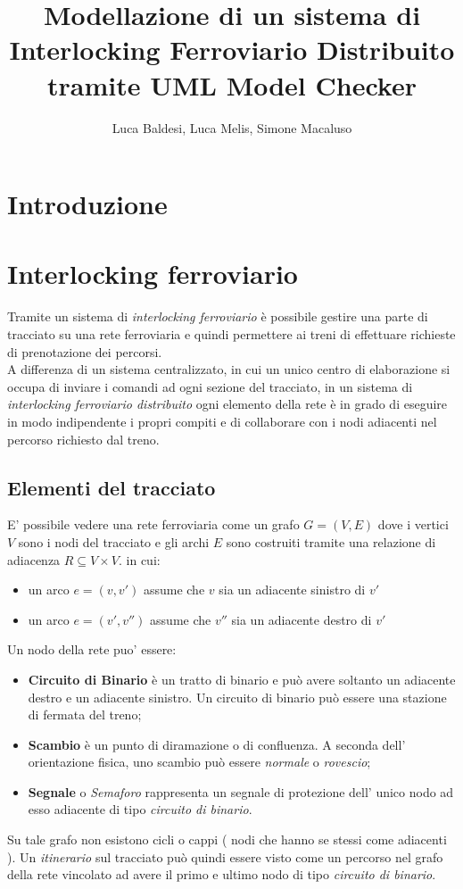 \documentclass[10pt,a4paper,oneside]{report}
\author{Luca Baldesi, Luca Melis, Simone Macaluso}
\title{Modellazione di un sistema di
Interlocking Ferroviario Distribuito
tramite UML Model Checker
}
\begin{document}
\maketitle

\chapter*{Introduzione}
\chapter{Interlocking ferroviario}
Tramite un sistema di \textit{interlocking ferroviario} è possibile gestire una parte di tracciato su una rete ferroviaria e quindi permettere ai treni di effettuare richieste di prenotazione dei percorsi.\\
A differenza di un sistema centralizzato, in cui un unico centro di elaborazione si occupa di inviare i comandi ad ogni sezione del tracciato, in un sistema di \textit{interlocking ferroviario distribuito} ogni elemento della rete è in grado di eseguire in modo indipendente i propri compiti e di collaborare con i nodi adiacenti nel percorso richiesto dal treno.
\section{Elementi del tracciato} 
E' possibile vedere una rete ferroviaria come un grafo $G =(V,E) $ dove i vertici $V$ sono i nodi del tracciato e gli archi $E$ sono costruiti tramite una relazione di adiacenza $R \subseteq V \times V$. in cui:
\begin{itemize}
\item un arco $e=(v,v')$ assume che $v$ sia un adiacente sinistro di $v'$ 
\item un arco $e=(v',v'')$ assume che $v''$ sia un adiacente destro di $v'$ 
\end{itemize}
Un nodo della rete puo' essere:
\begin{itemize}
\item \textbf{Circuito di Binario} è un tratto di binario e può avere soltanto un adiacente destro e un adiacente sinistro. Un circuito di binario può essere una stazione di fermata del treno;
\item \textbf{Scambio} è un punto di diramazione o di confluenza. A seconda dell' orientazione fisica, uno scambio può essere \textit{normale} o \textit{rovescio}; 
\item \textbf{Segnale} o \emph{Semaforo} rappresenta un segnale di protezione dell' unico nodo ad esso adiacente di tipo \emph{circuito di binario}.
\end{itemize}
Su tale grafo non esistono cicli o cappi ( nodi che hanno se stessi come adiacenti ).
Un \emph{itinerario} sul tracciato può quindi essere visto come un percorso nel grafo della rete vincolato ad avere il primo e ultimo nodo di tipo \emph{circuito di binario}.
\end{document}
